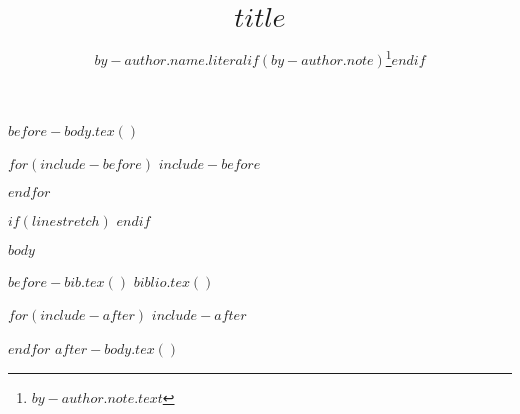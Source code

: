 \documentclass[$if(papersize)$$papersize$, $endif$$for(classoption)$$classoption$$sep$, $endfor$]{lipics-v2021}
\title{$title$} %
\author{$by-author.name.literal$$if(by-author.note)$\footnote{$by-author.note.text$}$endif$}{$for(by-author.affiliations)$$by-author.affiliations.name$$if(by-author.affiliations.address)$, $by-author.affiliations.address$$endif$$if(by-author.affiliations.city)$, $by-author.affiliations.city$$endif$$if(by-author.affiliations.postal-code)$, $by-author.affiliations.postal-code$$endif$$if(by-author.affiliations.country)$, $by-author.affiliations.country$$endif$$sep$ \and $endfor$$if(by-author.url)$$if(by-author.affiliations)$\and $endif$\url{$by-author.url$}$endif$}{$if(by-author.email)$$by-author.email$$endif$}{$if(by-author.orcid)$https://orcid.org/$by-author.orcid$$endif$}{$if(by-author.acknowledgements)$$by-author.acknowledgements$$endif$}
\begin{document}
$before-body.tex()$

$for(include-before)$
$include-before$

$endfor$

$if(linestretch)$
$endif$

$body$

$before-bib.tex()$
$biblio.tex()$

$for(include-after)$
$include-after$

$endfor$
$after-body.tex()$
\end{document}
